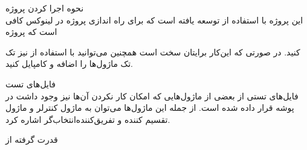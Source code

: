 \documentclass{article}[12pt]
\begin{document}
نحوه اجرا کردن پروژه\\
این پروژه با استفاده از 
توسعه یافته است که برای راه اندازی پروژه در لینوکس کافی است که پروژه

کنید. در صورتی که این‌کار برایتان سخت است همچنین می‌توانید با استفاده از
نیز تک تک ماژول‌ها را اضافه و کامپایل کنید.

فایل‌های تست\\
فایل‌های تستی از بعضی از ماژول‌هایی که امکان کار نکردن آن‌ها نیز وجود داشت در پوشه 
قرار داده شده است. از جمله این ماژول‌ها می‌توان به ماژول کنترلر و ماژول تقسیم کننده و تفریق‌کننده‌انتخاب‌گر اشاره کرد.\\

\begin{centering}
قدرت گرفته از \lr{\LaTeX}

\end{centering}
\end{document}
